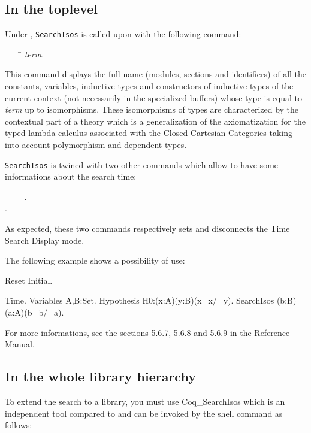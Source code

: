 \documentclass[11pt]{article}
\begin{document}
\begin{coq_example*}
\subsection{In the {\Coq} toplevel}

Under \Coq, \texttt{SearchIsos} is called upon with the following command:

\begin{tabbing}
\ \ \ \ \=\kill
{} {\it term}.
\end{tabbing}

This command displays the full name (modules, sections and identifiers) of all
the constants, variables, inductive types and constructors of inductive types
of the current context (not necessarily in the specialized
buffers) whose type is equal to {\it term} up to isomorphisms. These
isomorphisms of types are characterized by the contextual part of a theory
which is a generalization of the axiomatization for the typed lambda-calculus
associated with the Closed Cartesian Categories taking into account
polymorphism and dependent types.

\texttt{SearchIsos} is twined with two other commands which allow to have some
informations about the search time:

\begin{tabbing}
\ \ \ \ \=\kill
{}.\\
.
\end{tabbing}

As expected, these two commands respectively sets and disconnects the Time
Search Display mode.

The following example shows a possibility of use:

\begin{coq_eval}
Reset Initial.
\end{coq_eval}
\begin{coq_example}
Time.
Variables A,B:Set.
Hypothesis H0:(x:A)(y:B)(x=x/\y=y).
SearchIsos (b:B)(a:A)(b=b/\a=a).
\end{coq_example}

For more informations, see the sections 5.6.7, 5.6.8 and 5.6.9 in the Reference
Manual.

\subsection{In the whole library hierarchy}

To extend the search to a {\Coq} library, you must use \textsf{Coq\_SearchIsos}
which is an independent tool compared to {\Coq} and can be invoked by the shell
command as follows:


\end{coq_example*}
\end{document}
